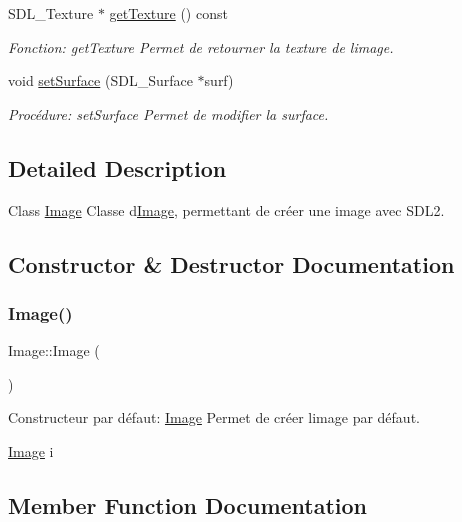 \begin{DoxyCompactItemize}
S\+D\+L\+\_\+\+Texture $\ast$ \hyperlink{classImage_ae9e27e310b4322d04366f2882f3a4242}{get\+Texture} () const
\begin{DoxyCompactList}\small\item\em Fonction\+: get\+Texture Permet de retourner la texture de l\textquotesingle{}image. \end{DoxyCompactList}\item 
void \hyperlink{classImage_a833f5d3b4b9f905320c6dffcc9b84b95}{set\+Surface} (S\+D\+L\+\_\+\+Surface $\ast$surf)
\begin{DoxyCompactList}\small\item\em Procédure\+: set\+Surface Permet de modifier la surface. \end{DoxyCompactList}\end{DoxyCompactItemize}


\subsection{Detailed Description}
Class \hyperlink{classImage}{Image} Classe d\textquotesingle{}\hyperlink{classImage}{Image}, permettant de créer une image avec S\+D\+L2. 

\subsection{Constructor \& Destructor Documentation}
\mbox{\label{classImage_a58edd1c45b4faeb5f789b0d036d02313}} 
\subsubsection{\texorpdfstring{Image()}{Image()}}
{\footnotesize\ttfamily Image\+::\+Image (\begin{DoxyParamCaption}{ }\end{DoxyParamCaption})}



Constructeur par défaut\+: \hyperlink{classImage}{Image} Permet de créer l\textquotesingle{}image par défaut. 


\begin{DoxyCode}
\hyperlink{classImage}{Image} i
\end{DoxyCode}
 

\subsection{Member Function Documentation}
\mbox{\label{classImage_a82d6936d466ba0161d8b9cbacf613de5}} 
